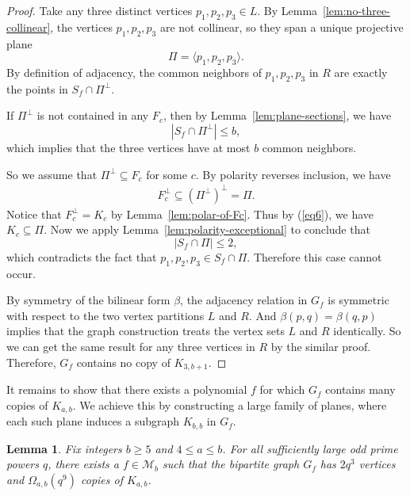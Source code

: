 \documentclass[11pt,a4paper]{article}
\newtheorem{lemma}[theorem]{Lemma}
\theoremstyle{definition}
\theoremstyle{remark}
\begin{document}
\begin{proof}
Take any three distinct vertices $p_1, p_2, p_3 \in L$. By Lemma~\ref{lem:no-three-collinear}, the vertices $p_1, p_2, p_3$ are not collinear, so they span a unique projective plane
\[
\Pi = \langle p_1, p_2, p_3 \rangle.
\]
By definition of adjacency, the common neighbors of $p_1,p_2,p_3$ in $R$ are exactly the points in $S_f \cap \Pi^\perp$.

If $\Pi^\perp$ is not contained in any $F_c$, then by Lemma~\ref{lem:plane-sections}, we have
\[
|S_f \cap \Pi^\perp| \leq b,
\]
which implies that the three vertices have at most $b$ common neighbors.

So we assume that $\Pi^\perp \subseteq F_c$ for some $c$. By polarity reverses inclusion, we have
\begin{align}\label{eq6}
F_c^\perp \subseteq (\Pi^\perp)^\perp = \Pi.
\end{align}
Notice that $F_c^\perp = K_c$ by Lemma~\ref{lem:polar-of-Fc}. Thus by (\ref{eq6}), we have $K_c \subseteq \Pi$. Now we apply  Lemma~\ref{lem:polarity-exceptional} to conclude that
\[
|S_f \cap \Pi| \leq 2,
\]
which contradicts the fact that $p_1,p_2,p_3 \in S_f \cap \Pi$. Therefore this case cannot occur.

By symmetry of the bilinear form $\beta$, the adjacency relation in $G_f$ is symmetric with respect to the two vertex partitions $L$ and $R$. And  $\beta(p,q)=\beta(q,p)$ implies that the graph construction treats the  vertex sets $L$ and $R$ identically. So we can get the same result for any three vertices in $R$ by the similar proof. Therefore, $G_f$ contains no copy of $K_{3,b+1}$. 
\end{proof}



It remains to show that there exists a polynomial $f$ for which $G_f$ contains many copies of $K_{a,b}$. We achieve this by constructing a large family of planes, where each such plane induces a  subgraph $K_{b,b}$ in $G_f$.

\begin{lemma} \label{lem:good-plane-count}
Fix integers $b \geq 5$ and $4 \leq a \leq b$. For all sufficiently large odd prime powers $q$, there exists a $f \in \mathcal{M}_b$ such that  the bipartite graph $G_f$ has $2q^3$ vertices and $\Omega_{a,b}(q^9)$ copies of $K_{a,b}$.
\end{lemma}
\end{document}
